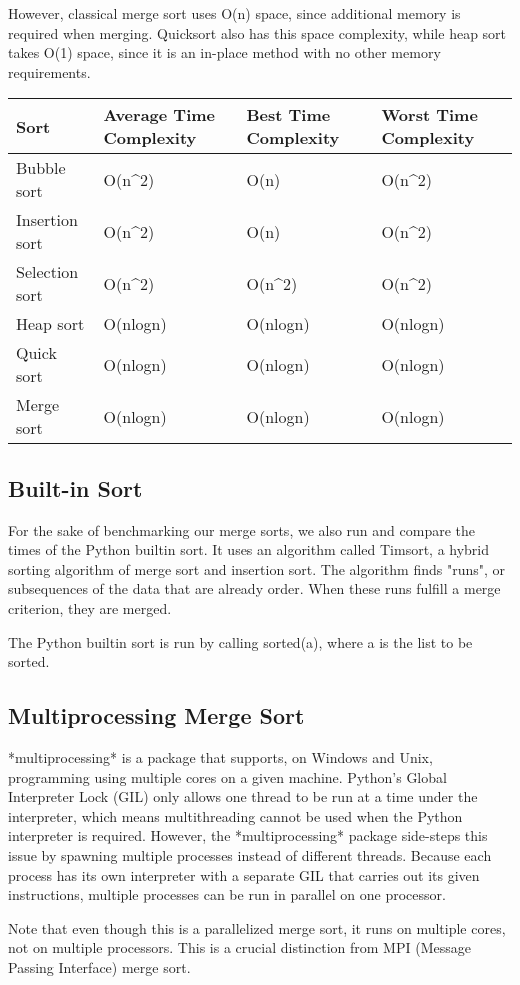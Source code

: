 However, classical merge sort uses O(n) space, since additional memory is required when merging. Quicksort also has this
space complexity, while heap sort takes O(1) space, since it is an in-place method with no other memory requirements.
\begin{longtable}[]{@{}llll@{}}
    \toprule
    Sort & Average Time Complexity & Best Time Complexity & Worst Time
    Complexity\tabularnewline
    \midrule
    \endhead
    Bubble sort & O(n\^{}2) & O(n) & O(n\^{}2)\tabularnewline
    Insertion sort & O(n\^{}2) & O(n) & O(n\^{}2)\tabularnewline
    Selection sort & O(n\^{}2) & O(n\^{}2) & O(n\^{}2)\tabularnewline
    Heap sort & O(nlogn) & O(nlogn) & O(nlogn)\tabularnewline
    Quick sort & O(nlogn) & O(nlogn) & O(nlogn)\tabularnewline
    Merge sort & O(nlogn) & O(nlogn) & O(nlogn)\tabularnewline
    \bottomrule
    \end{longtable}

\subsection{Built-in Sort}

For the sake of benchmarking our merge sorts, we also run and compare the times of the Python builtin sort.  
It uses an algorithm called Timsort, a hybrid sorting algorithm of merge sort and insertion sort. The algorithm 
finds "runs", or subsequences of the data that are already order. When these runs fulfill a merge criterion, 
they are merged. 

The Python builtin sort is run by calling sorted(a), where a is the list to be sorted. 

\subsection{Multiprocessing Merge Sort}

*multiprocessing* is a package that supports, on Windows and Unix, programming using multiple cores on a given
machine. Python's Global Interpreter Lock (GIL) only allows one thread to be run at a time under the interpreter, which
means multithreading cannot be used when the Python interpreter is required. However, the *multiprocessing* package
side-steps this issue by spawning multiple processes instead of different threads. Because each process has its own interpreter with a
separate GIL that carries out its given instructions, multiple processes can be run in parallel on one processor.  

Note that even though this is a parallelized merge sort, it runs on multiple cores, not on multiple processors. 
This is a crucial distinction from MPI (Message Passing Interface) merge sort. 

